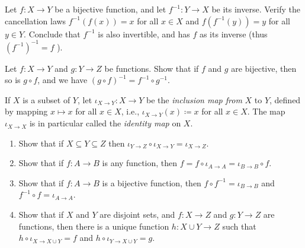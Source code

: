 \begin{exercise} \label{exercise 3.3.6}
Let \(f : X \rightarrow Y\) be a bijective function, and let \(f^{-1} : Y \rightarrow X\) be its inverse. Verify the cancellation laws \(f^{-1}(f(x)) = x\) for all \(x \in X\) and \(f(f^{-1}(y)) = y\) for all \(y \in Y\). Conclude that \(f^{-1}\) is also invertible, and has \(f\) as its inverse (thus \( (f^{-1})^{-1} = f \) ).
\end{exercise}

\begin{exercise} \label{exercise 3.3.7}
Let \(f : X \rightarrow Y\) and \(g : Y \rightarrow Z\) be functions. Show that if \(f\) and \(g\) are bijective, then so is \(g \circ f\), and we have \((g \circ f)^{-1} = f^{-1} \circ g^{-1}\).
\end{exercise}

\begin{exercise} \label{exercise 3.3.8}
If \(X\) is a subset of \(Y\), let \(\iota_{X \to Y} : X \to Y\) be the \emph{inclusion map from} \(X\) to \(Y\), defined by mapping \(x \mapsto x\) for all \(x \in X\), i.e., \(\iota_{X \to Y}(x) \coloneqq x\) for all \(x \in X\). The map \(\iota_{X \to X}\) is in particular called the \emph{identity map} on \(X\).
    \begin{enumerate}
        \item Show that if \(X \subseteq Y \subseteq Z\) then \(\iota_{Y \to Z} \circ \iota_{X \to Y} = \iota_{X \to Z}\).
        \item Show that if \(f : A \to B\) is any function, then \(f = f \circ \iota_{A \to A} = \iota_{B \to B} \circ f\).
        \item Show that if \(f : A \to B\) is a bijective function, then \(f \circ f^{-1} = \iota_{B \to B}\) and \(f^{-1} \circ f = \iota_{A \to A}\).
        \item Show that if \(X\) and \(Y\) are disjoint sets, and \(f : X \to Z\) and \(g : Y \to Z\) are functions, then there is a unique function \(h : X \cup Y \to Z\) such that \(h \circ \iota_{X \to X \cup Y} = f\) and \(h \circ \iota_{Y \to X \cup Y} = g\).
    \end{enumerate}
\end{exercise}